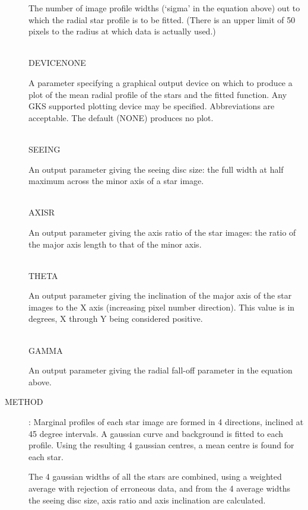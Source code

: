 \begin{description}
\begin{tabbing}
\begin{minipage}[t]{100mm}
The number of image profile widths (`sigma' in the equation above) out to which
the radial star profile is to be fitted.
(There is an upper limit of 50 pixels to the radius at which data is actually
used.)
\end{minipage}\\
DEVICE\>NONE\>\begin{minipage}[t]{100mm}
A parameter specifying a graphical output device on which to produce a plot of
the mean radial profile of the stars and the fitted function.
Any GKS supported plotting device may be specified.
Abbreviations are acceptable.
The default (NONE) produces no plot.
\end{minipage}\\
SEEING\>\>\begin{minipage}[t]{100mm}
An output parameter giving the seeing disc size: the full width at half
maximum across the minor axis of a star image.
\end{minipage}\\
AXISR\>\>\begin{minipage}[t]{100mm}
An output parameter giving the axis ratio of the star images: the ratio of the
major axis length to that of the minor axis.
\end{minipage}\\
THETA\>\>\begin{minipage}[t]{100mm}
An output parameter giving the inclination of the major axis of the star images
to the X axis (increasing pixel number direction). 
This value is in degrees, X through Y being considered positive.
\end{minipage}\\
GAMMA\>\>\begin{minipage}[t]{100mm}
An output parameter giving the radial fall-off parameter in the equation above.
\end{minipage}
\end{tabbing}
\item [METHOD]:
Marginal profiles of each star image are formed in 4 directions, inclined at
45 degree intervals.
A gaussian curve and background is fitted to each profile.
Using the resulting 4 gaussian centres, a mean centre is found for each star.

The 4 gaussian widths of all the stars are combined, using a weighted average
with rejection of erroneous data, and from the 4 average widths the seeing disc
size, axis ratio and axis inclination are calculated.


\end{description}
